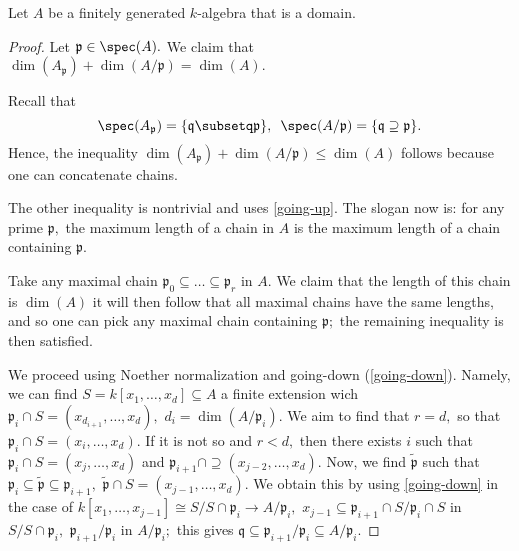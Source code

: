 \begin{theorem}
  Let \(A\) be a finitely generated \(k\)-algebra that is a domain.
\end{theorem}
\begin{proof}
  Let \(\mathfrak{p}\in \spec(A).\) We claim that
  \(\dim (A_{\mathfrak{p}}) + \dim(A/{\mathfrak{p}}) = \dim(A).\)

  Recall that
  \[\spec(A_{\mathfrak{p}}) = \{\mathfrak{q} \subsetq \mathfrak{p}\}, \enspace\spec(A/{\mathfrak{p}}) = \{\mathfrak{q} \supseteq \mathfrak{p}\}.\]
  Hence, the inequality
  \(\dim(A_{\mathfrak{p}}) + \dim(A/{\mathfrak{p}}) \leq \dim(A)\)
  follows because one can concatenate chains.

  The other inequality is nontrivial and uses \cref{going-up}. The slogan now is: for any prime \(\mathfrak{p},\) the maximum length of a chain in \(A\) is the maximum length of a chain containing \(\mathfrak{p}.\)

  Take any maximal chain \(\mathfrak{p}_0 \subseteq \dotso \subseteq \mathfrak{p}_r\) in \(A.\) We claim that the length of this chain is \(\dim(A)\) it will then follow that all maximal chains have the same lengths, and so one can pick any maximal chain containing \(\mathfrak{p};\) the remaining inequality is then satisfied.

  We proceed using Noether normalization and going-down (\cref{going-down}). Namely, we can find \(S = k[x_1, \dotsc, x_d] \subseteq A\) a finite extension wich \(\mathfrak{p}_i \cap S = (x_{d_{i+1}}, \dotsc, x_d),\) \(d_i = \dim(A/{\mathfrak{p}_i}).\)
  We aim to find that \(r = d,\) so that \(\mathfrak{p}_i \cap S = (x_i, \dotsc, x_d).\)
  If it is not so and \(r < d,\) then there exists \(i\) such that
  \(\mathfrak{p}_i \cap S = (x_j, \dotsc, x_d)\)
  and
  \(\mathfrak{p}_{i+1} \cap \supseteq (x_{j-2}, \dotsc, x_d).\)
  Now, we find \(\tilde{\mathfrak{p}}\) such that \(\mathfrak{p}_i \subseteq \tilde{\mathfrak{p}} \subseteq \mathfrak{p}_{i+1},\) \(\tilde{\mathfrak{p}} \cap S = (x_{j-1}, \dotsc, x_d).\)
  We obtain this by using \cref{going-down} in the case of
  \(k[x_1, \dotsc, x_{j-1}] \cong S/{S \cap \mathfrak{p}_i} \to A/{\mathfrak{p}_i},\)
  \(x_{j-1} \subseteq \mathfrak{p}_{i+1} \cap S /{\mathfrak{p}_i \cap S}\) in \(S/{S \cap \mathfrak{p}_i},\)
  \(\mathfrak{p}_{i+1}/{\mathfrak{p}_i}\) in \(A/{\mathfrak{p}_i};\) this gives
  \(\mathfrak{q} \subseteq \mathfrak{p}_{i+1}/{\mathfrak{p}_i} \subseteq A/{\mathfrak{p}_i}.\)
\end{proof}


